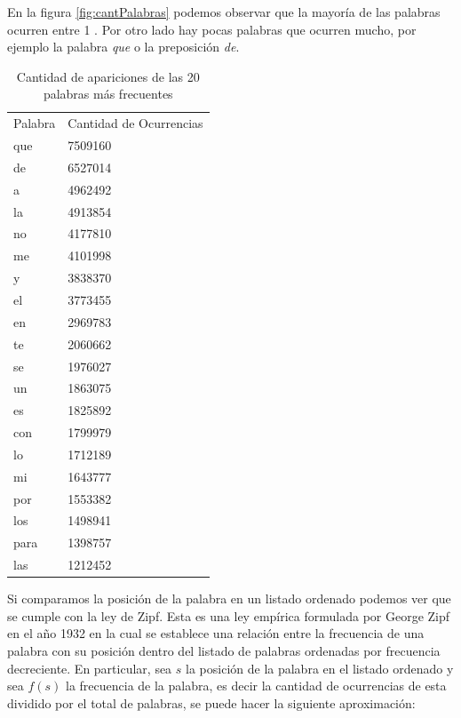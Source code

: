 En la figura \ref{fig:cantPalabras} podemos observar que la mayoría de las palabras ocurren entre 1 . Por otro lado hay pocas palabras que ocurren mucho, por ejemplo la palabra \textit{que} o la preposición \textit{de}.

\begin{table}[]
\centering
\caption{Cantidad de apariciones de las 20 palabras más frecuentes}
\label{tabla:palabrasMasOcurrentes}
\begin{tabular}{ll}
Palabra & Cantidad de Ocurrencias \\
que     & 7509160                 \\
de      & 6527014                 \\
a       & 4962492                 \\
la      & 4913854                 \\
no      & 4177810                 \\
me      & 4101998                 \\
y       & 3838370                 \\
el      & 3773455                 \\
en      & 2969783                 \\
te      & 2060662                 \\
se      & 1976027                 \\
un      & 1863075                 \\
es      & 1825892                 \\
con     & 1799979                 \\
lo      & 1712189                 \\
mi      & 1643777                 \\
por     & 1553382                 \\
los     & 1498941                 \\
para    & 1398757                 \\
las     & 1212452                
\end{tabular}
\end{table}

Si comparamos la posición de la palabra en un listado ordenado podemos ver que se cumple con la ley de Zipf. Esta es una ley empírica formulada por George Zipf en el año 1932 en la cual se establece una relación entre la frecuencia de una palabra con su posición dentro del listado de palabras ordenadas por frecuencia decreciente. En particular, sea $s$ la posición de la palabra en el listado ordenado y sea $f(s)$ la frecuencia de la palabra, es decir la cantidad de ocurrencias de esta dividido por el total de palabras, se puede hacer la siguiente aproximación:

